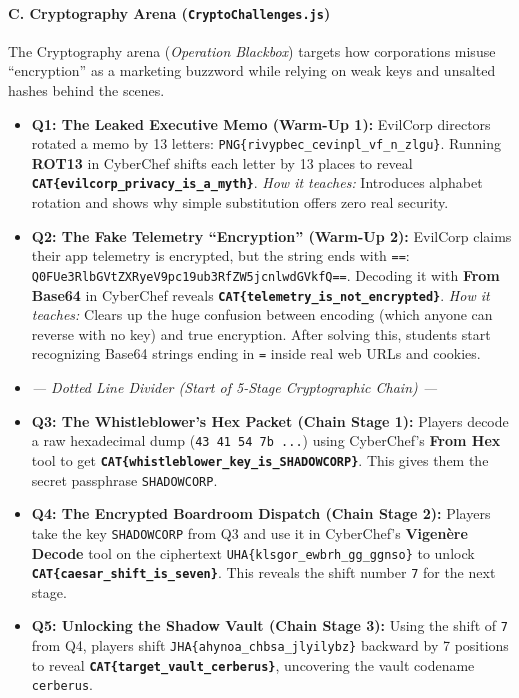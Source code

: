 \documentclass[11pt,a4paper]{article}
\begin{document}
\paragraph{C. Cryptography Arena (\texttt{CryptoChallenges.js})}
The Cryptography arena (\textit{Operation Blackbox}) targets how corporations misuse ``encryption'' as a marketing buzzword while relying on weak keys and unsalted hashes behind the scenes.
\begin{itemize}
    \item \textbf{Q1: The Leaked Executive Memo (Warm-Up 1):} EvilCorp directors rotated a memo by 13 letters: \texttt{PNG\{rivypbec\_cevinpl\_vf\_n\_zlgu\}}. Running \textbf{ROT13} in CyberChef shifts each letter by 13 places to reveal \textbf{\texttt{CAT\{evilcorp\_privacy\_is\_a\_myth\}}}. \textit{How it teaches:} Introduces alphabet rotation and shows why simple substitution offers zero real security.
    \item \textbf{Q2: The Fake Telemetry ``Encryption'' (Warm-Up 2):} EvilCorp claims their app telemetry is encrypted, but the string ends with \texttt{==}: \texttt{Q0FUe3RlbGVtZXRyeV9\allowbreak pc19ub3RfZW5jcnlwdGVkfQ==}. Decoding it with \textbf{From Base64} in CyberChef reveals \textbf{\texttt{CAT\{telemetry\_\allowbreak is\_not\_encrypted\}}}. \textit{How it teaches:} Clears up the huge confusion between encoding (which anyone can reverse with no key) and true encryption. After solving this, students start recognizing Base64 strings ending in \texttt{=} inside real web URLs and cookies.
    \item \textit{--- Dotted Line Divider (Start of 5-Stage Cryptographic Chain) ---}
    \item \textbf{Q3: The Whistleblower's Hex Packet (Chain Stage 1):} Players decode a raw hexadecimal dump (\texttt{43 41 54 7b ...}) using CyberChef's \textbf{From Hex} tool to get \textbf{\texttt{CAT\{whistleblower\_\allowbreak key\_is\_SHADOWCORP\}}}. This gives them the secret passphrase \texttt{SHADOWCORP}.
    \item \textbf{Q4: The Encrypted Boardroom Dispatch (Chain Stage 2):} Players take the key \texttt{SHADOWCORP} from Q3 and use it in CyberChef's \textbf{Vigen\`ere Decode} tool on the ciphertext \texttt{UHA\{klsgor\_ewbrh\_gg\_ggnso\}} to unlock \textbf{\texttt{CAT\{caesar\_shift\_is\_seven\}}}. This reveals the shift number \texttt{7} for the next stage.
    \item \textbf{Q5: Unlocking the Shadow Vault (Chain Stage 3):} Using the shift of \texttt{7} from Q4, players shift \texttt{JHA\{ahynoa\_chbsa\_jlyilybz\}} backward by 7 positions to reveal \textbf{\texttt{CAT\{target\_vault\_cerberus\}}}, uncovering the vault codename \texttt{cerberus}.

\end{itemize}
\end{document}
